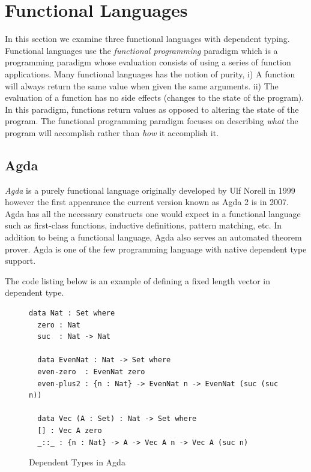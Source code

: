 \documentclass[a4paper,12pt]{report}
\begin{document}
\section{Functional Languages}
In this section we examine three functional languages with 
dependent typing. Functional languages 
use the \textit{functional programming} \cite{overviewFP} paradigm which 
is a programming paradigm whose evaluation consists of using a series of function 
applications. Many functional languages has the notion of purity, i) A function will always 
return the same value when given the same arguments. ii) The evaluation of a 
function has no side effects (changes to the state of the program).
 In this paradigm, functions return values as opposed to 
altering the state of the program. The functional programming paradigm 
focuses on describing \textit{what} the program will accomplish rather than 
\textit{how} it accomplish it. 

\subsection{Agda}

\textit{Agda} \cite{agda} is a purely functional language originally developed by Ulf Norell in 
1999 however the first appearance the current version known as Agda 2 is in 
2007. Agda has all the necessary constructs one would expect in a functional 
language such as first-class functions, inductive definitions, pattern matching, 
etc. In addition to being a functional language, Agda also serves an automated theorem prover. 
Agda is one of the few programming language with native dependent type support. 

\par
The code listing below is an example of defining a fixed length vector in 
dependent type. 

\begin{figure}[H]
  \begin{lstlisting}[mathescape=true] 
  data Nat : Set where 
  zero : Nat
  suc  : Nat -> Nat  
  
  data EvenNat : Nat -> Set where
  even-zero  : EvenNat zero
  even-plus2 : {n : Nat} -> EvenNat n -> EvenNat (suc (suc n))
  
  data Vec (A : Set) : Nat -> Set where
  [] : Vec A zero
  _::_ : {n : Nat} -> A -> Vec A n -> Vec A (suc n)
  \end{lstlisting}
  \caption{Dependent Types in Agda}
\end{figure}
\end{document}
